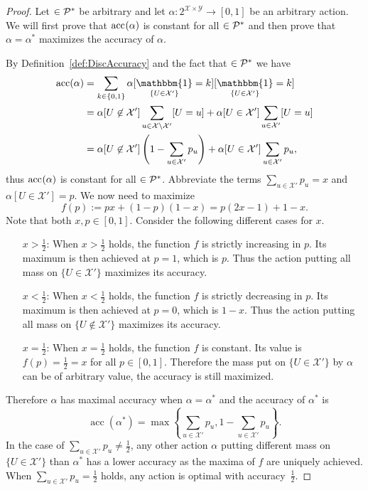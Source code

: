\documentclass[a4paper]{report}
\theoremstyle{plain}
\theoremstyle{definition}
\theoremstyle{remark}
\numberwithin{equation}{chapter}
\let\P\relax
\DeclareMathOperator{\P}{\mathbb{P}}
\DeclareMathOperator{\1}{\mathbbm{1}}
\newcommand{\X}{\mathcal{X}}
\newcommand{\Y}{\mathcal{Y}}
\DeclareMathOperator{\acc}{acc}
\newcommand{\Pmod}{\mathcal{P}^*}
\newcommand{\GeneralGenInd}{\1_{\{U\in\X'\}}}
\begin{document}
\begin{proof}
Let $\P\in\Pmod$ be arbitrary and let $\alpha\colon2^{\X\times\Y}\to[0,1]$ be an arbitrary action. We will first prove that $\acc^{\P}(\alpha)$ is constant for all $\P\in\Pmod$ and then prove that $\alpha=\alpha^*$ maximizes the accuracy of $\alpha$.

By Definition~\ref{def:DiscAccuracy} and the fact that $\P\in\Pmod$ we have
\begin{align}
\acc_{\P}(\alpha)&=\sum_{k\in\{0,1\}}\alpha[\GeneralGenInd=k]\P[\GeneralGenInd=k]\\
&=\alpha[U\not\in\X']\sum_{u\in\X\setminus\X'}\P[U=u]+\alpha[U\in\X']\sum_{u\in\X'}\P[U=u]\\
&=\alpha[U\not\in\X']\left(1-\sum_{u\in\X'}p_u\right)+\alpha[U\in\X']\sum_{u\in\X'}p_u,
\end{align}
thus $\acc^{\P}(\alpha)$ is constant for all $\P\in\Pmod$. Abbreviate the terms $\sum_{u\in\X'}p_u=x$ and $\alpha[U\in\X']=p$. We now need to maximize
\begin{equation}
f(p):=px+(1-p)(1-x)=p(2x-1)+1-x.
\end{equation}
Note that both $x,p\in[0,1]$. Consider the following different cases for $x$.
\begin{itemize}
    \item[$x>\frac{1}{2}$:] When $x>\frac{1}{2}$ holds, the function $f$ is strictly increasing in $p$. Its maximum is then achieved at $p=1$, which is $p$. Thus the action putting all mass on $\{U\in\X'\}$ maximizes its accuracy.
    \item[$x<\frac{1}{2}$:] When $x<\frac{1}{2}$ holds, the function $f$ is strictly decreasing in $p$. Its maximum is then achieved at $p=0$, which is $1-x$. Thus the action putting all mass on $\{U\not\in\X'\}$ maximizes its accuracy.
    \item[$x=\frac{1}{2}$:] When $x=\frac{1}{2}$ holds, the function $f$ is constant. Its value is $f(p)=\frac{1}{2}=x$ for all $p\in[0,1]$. Therefore the mass put on $\{U\in\X'\}$ by $\alpha$ can be of arbitrary value, the accuracy is still maximized.
\end{itemize}
Therefore $\alpha$ has maximal accuracy when $\alpha=\alpha^*$ and the accuracy of $\alpha^*$ is
\begin{equation}
\acc\left(\alpha^*\right)=\max\left\{\sum_{u\in\X'}p_u,1-\sum_{u\in\X'}p_u\right\}.
\end{equation}
In the case of $\sum_{u\in\X'}p_u\neq\frac{1}{2}$, any other action $\alpha$ putting different mass on $\{U\in\X'\}$ than $\alpha^*$ has a lower accuracy as the maxima of $f$ are uniquely achieved. When $\sum_{u\in\X'}p_u=\frac{1}{2}$ holds, any action is optimal with accuracy~$\frac{1}{2}$.
\end{proof}
\end{document}
